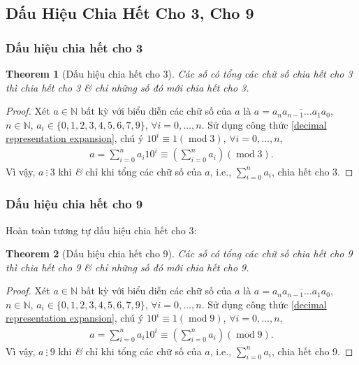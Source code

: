 \documentclass{article}
\numberwithin{equation}{section}
\newtheorem{theorem}{Theorem}[section]
\begin{document}
\subsection{Dấu Hiệu Chia Hết Cho 3, Cho 9}

\subsubsection{Dấu hiệu chia hết cho 3}

\begin{theorem}[Dấu hiệu chia hết cho 3]
	Các số có tổng các chữ số chia hết cho 3 thì chia hết cho 3 \textit{\&} chỉ những số đó mới chia hết cho 3.
\end{theorem}

\begin{proof}[Proof]
	Xét $a\in\mathbb{N}$ bất kỳ với biểu diễn các chữ số của $a$ là $a = \overline{a_na_{n-1}\ldots a_1a_0}$, $n\in\mathbb{N}$, $a_i\in\{0,1,2,3,4,5,6,7,9\}$, $\forall i = 0,\ldots,n$. Sử dụng công thức \eqref{decimal representation expansion}, chú ý $10^i\equiv 1(\operatorname{mod} 3)$, $\forall i = 0,\ldots,n$,
	\begin{align*}
		a = \sum_{i=0}^n a_i10^i\equiv\left(\sum_{i=0}^n a_i\right)(\operatorname{mod} 3).
	\end{align*}
	Vì vậy, $a\ \vdots\ 3$ khi \textit{\&} chỉ khi tổng các chữ số của $a$, i.e., $\sum_{i=0}^n a_i$, chia hết cho 3.
\end{proof}

\subsubsection{Dấu hiệu chia hết cho 9}
Hoàn toàn tương tự dấu hiệu chia hết cho 3:

\begin{theorem}[Dấu hiệu chia hết cho 9]
	Các số có tổng các chữ số chia hết cho 9 thì chia hết cho 9 \textit{\&} chỉ những số đó mới chia hết cho 9.
\end{theorem}

\begin{proof}[Proof]
	Xét $a\in\mathbb{N}$ bất kỳ với biểu diễn các chữ số của $a$ là $a = \overline{a_na_{n-1}\ldots a_1a_0}$, $n\in\mathbb{N}$, $a_i\in\{0,1,2,3,4,5,6,7,9\}$, $\forall i = 0,\ldots,n$. Sử dụng công thức \eqref{decimal representation expansion}, chú ý $10^i\equiv 1(\operatorname{mod} 9)$, $\forall i = 0,\ldots,n$,
	\begin{align*}
		a = \sum_{i=0}^n a_i10^i\equiv\left(\sum_{i=0}^n a_i\right)(\operatorname{mod} 9).
	\end{align*}
	Vì vậy, $a\ \vdots\ 9$ khi \textit{\&} chỉ khi tổng các chữ số của $a$, i.e., $\sum_{i=0}^n a_i$, chia hết cho 9.
\end{proof}
\end{document}
